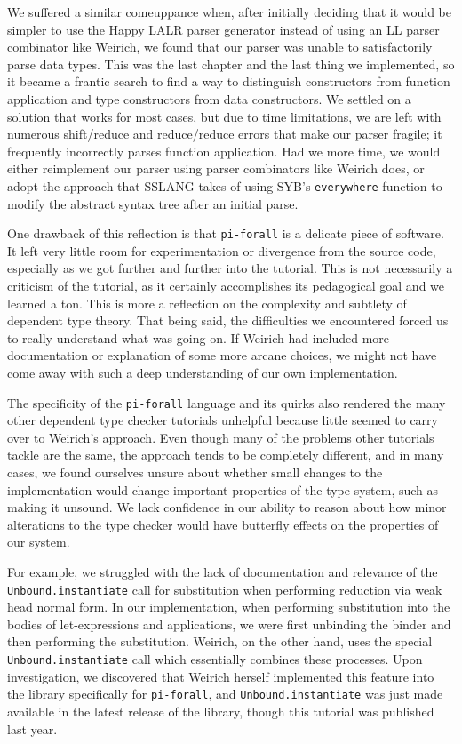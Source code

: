 We suffered a similar comeuppance when, after initially deciding that it would
be simpler to use the Happy LALR parser generator instead of using an LL parser
combinator like Weirich, we found that our parser was unable to satisfactorily
parse data types. This was the last chapter and the last thing we implemented,
so it became a frantic search to find a way to distinguish constructors from
function application and type constructors from data constructors. We settled
on a solution that works for most cases, but due to time limitations, we are
left with numerous shift/reduce and reduce/reduce errors that make our parser
fragile; it frequently incorrectly parses function application. Had we more
time, we would either reimplement our parser using parser combinators like Weirich
does, or adopt the approach that SSLANG takes of using SYB's
\texttt{everywhere} function to modify the abstract syntax tree after an
initial parse.

One drawback of this reflection is that \texttt{pi-forall} is a delicate piece of software. 
It left very little room for experimentation or divergence from the source code, especially as we got further and further into the tutorial.
This is not necessarily a criticism of the tutorial, as it certainly
accomplishes its pedagogical goal and we learned a ton. This is more a
reflection on the complexity and subtlety of dependent type theory. That being
said, the difficulties we encountered forced us to really understand what was
going on. If Weirich had included more documentation or explanation of some
more arcane choices, we might not have come away with such a deep understanding
of our own implementation.

The specificity of the \texttt{pi-forall} language and its quirks also rendered
the many other dependent type checker tutorials unhelpful because little seemed
to carry over to Weirich's approach.
Even though many of the problems other tutorials tackle are the same, the approach tends to
be completely different, and in many cases, we found ourselves unsure about whether small
changes to the implementation would change important properties of the type
system, such as making it unsound. We lack confidence in our ability to
reason about how minor alterations to the type checker would have butterfly
effects on the properties of our system.

For example, we struggled with the lack of documentation and relevance of the \texttt{Unbound.instantiate} call for substitution when performing reduction via weak head normal form.
In our implementation, when performing substitution into the bodies of let-expressions and applications, we were first unbinding the binder and then performing the substitution. 
Weirich, on the other hand, uses the special \texttt{Unbound.instantiate} call which essentially combines these processes. 
Upon investigation, we discovered that Weirich herself implemented this feature into the library specifically for \texttt{pi-forall}, and \texttt{Unbound.instantiate} was just made available in the latest release of the library, though this tutorial was published last year.

